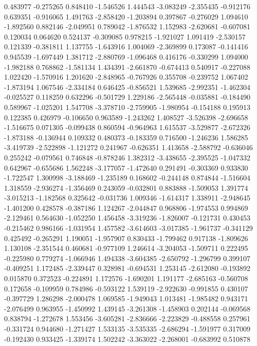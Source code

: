 0.483977
-0.275265
0.848410
-1.546526
1.444543
-3.083249
-2.355435
-0.912176
0.639351
-0.916065
1.491763
-2.858420
-1.203894
0.397867
-0.276029
1.094610
-1.892560
0.882146
-2.049951
0.789042
-1.876532
1.152983
-2.620681
-0.607081
0.120034
0.064620
0.524137
-0.309085
0.978215
-1.921027
1.091419
-2.530157
0.121339
-0.381811
1.137755
-1.643916
1.004069
-2.369899
0.173087
-0.141416
0.945539
-1.697449
1.381712
-2.880769
-1.096468
0.416176
-0.330299
1.094000
-1.982188
0.768862
-1.581134
1.434391
-2.661870
-0.674413
0.540917
-0.227088
1.022420
-1.570916
1.201620
-2.848965
-0.767926
0.355708
-0.239752
1.067402
-1.873194
1.067546
-2.334184
0.646425
-0.856521
1.539685
-2.992351
-1.462304
-0.025527
0.118259
0.632296
-0.501729
1.229186
-2.565448
-0.035881
-0.184490
0.589967
-1.025201
1.547708
-3.378710
-2.759905
-1.980954
-0.154188
0.195913
0.122385
0.426979
-0.106650
0.963589
-1.243262
1.408527
-3.526398
-2.696658
-1.516675
0.071305
-0.099438
0.860594
-0.964963
1.615537
-3.529877
-2.672326
-1.873188
-0.136944
0.109332
0.480373
-0.183359
0.716500
-1.246236
1.586285
-3.419739
-2.522898
-1.121272
0.241967
-0.626351
1.413658
-2.588792
-0.636046
0.255242
-0.079561
0.746848
-0.878246
1.382312
-3.438655
-2.395525
-1.047332
0.642967
-0.655686
1.562248
-3.177057
-1.472640
0.291491
-0.303369
0.933830
-1.722547
1.300998
-3.188469
-1.235189
0.168602
-0.244148
0.874844
-1.516604
1.318559
-2.936274
-1.356469
0.243059
-0.032801
0.883888
-1.509053
1.391774
-3.015213
-1.182568
0.325642
-0.031736
1.009346
-1.614317
1.338911
-2.948645
-1.401200
0.428578
-0.387186
1.124267
-2.044847
0.968806
-1.974553
0.994869
-2.129461
0.564630
-1.052250
1.456458
-3.319236
-1.826007
-0.121731
0.430453
-0.215462
0.986166
-1.031954
1.457582
-3.614603
-3.017385
-1.961737
-0.341129
0.425492
-0.265291
1.190051
-1.957907
0.830433
-1.799462
0.917138
-1.809626
1.130108
-2.351544
0.460681
-0.977109
1.246614
-3.204053
-1.509711
0.222495
-0.225980
0.779274
-1.066946
1.494338
-3.604385
-2.650792
-1.296799
0.399107
-0.409251
1.172485
-2.339447
0.328981
-0.694531
1.253145
-2.612080
-0.193892
0.015870
0.372523
-0.224891
1.172576
-1.690201
1.191177
-2.685163
-0.560708
0.172658
-0.109959
0.784986
-0.593122
1.539119
-2.922630
-0.991855
0.430107
-0.397729
1.286298
-2.000478
1.069585
-1.949043
1.013481
-1.985482
0.943171
-2.076499
0.963955
-1.450992
1.439145
-3.261308
-1.458903
0.202144
-0.069568
0.838794
-1.272678
1.553456
-3.605281
-2.836666
-2.223829
-0.488558
0.257961
-0.331724
0.944680
-1.271427
1.533135
-3.535335
-2.686294
-1.591977
0.317009
-0.192430
0.933425
-1.339174
1.502242
-3.363022
-2.268001
-0.683992
0.510878

